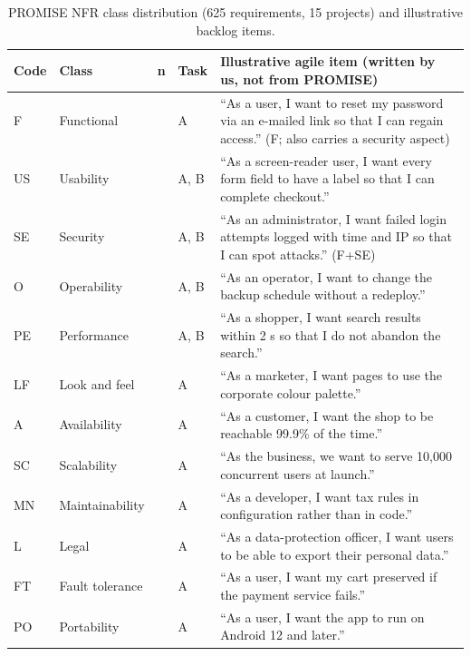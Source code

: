 \documentclass[conference,10pt,letterpaper]{IEEEtran}
\begin{document}
\begin{table}[!t]
\centering
\caption{PROMISE NFR class distribution (625 requirements, 15 projects) and illustrative backlog items.}
\label{tab:data}
\footnotesize
\setlength{\tabcolsep}{3pt}
\renewcommand{\arraystretch}{1.12}
\begin{tabular}{>{\raggedright\arraybackslash}p{0.7cm}>{\raggedright\arraybackslash}p{1.9cm}>{\raggedright\arraybackslash}p{0.6cm}>{\raggedright\arraybackslash}p{0.8cm}>{\raggedright\arraybackslash}p{11.2cm}}
\toprule
\textbf{Code} & \textbf{Class} & \textbf{n} & \textbf{Task} & \textbf{Illustrative agile item (written by us, not from PROMISE)} \\
\midrule
F & Functional & 255 & A & “As a user, I want to reset my password via an e-mailed link so that I can regain access.” (F; also carries a security aspect) \\
US & Usability & 67 & A, B & “As a screen-reader user, I want every form field to have a label so that I can complete checkout.” \\
SE & Security & 66 & A, B & “As an administrator, I want failed login attempts logged with time and IP so that I can spot attacks.” (F+SE) \\
O & Operability & 62 & A, B & “As an operator, I want to change the backup schedule without a redeploy.” \\
PE & Performance & 54 & A, B & “As a shopper, I want search results within 2 s so that I do not abandon the search.” \\
LF & Look and feel & 38 & A & “As a marketer, I want pages to use the corporate colour palette.” \\
A & Availability & 21 & A & “As a customer, I want the shop to be reachable 99.9\% of the time.” \\
SC & Scalability & 21 & A & “As the business, we want to serve 10,000 concurrent users at launch.” \\
MN & Maintainability & 17 & A & “As a developer, I want tax rules in configuration rather than in code.” \\
L & Legal & 13 & A & “As a data-protection officer, I want users to be able to export their personal data.” \\
FT & Fault tolerance & 10 & A & “As a user, I want my cart preserved if the payment service fails.” \\
PO & Portability & 1 & A & “As a user, I want the app to run on Android 12 and later.” \\
\bottomrule
\end{tabular}
\end{table}
\end{document}
